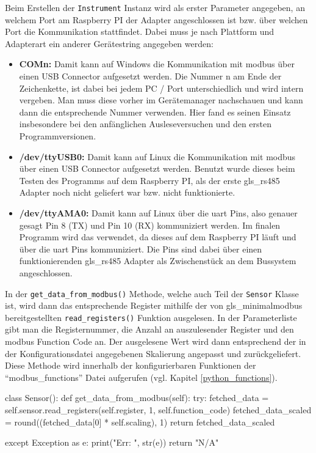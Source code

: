Beim Erstellen der \lstinline{Instrument} Instanz wird als erster Parameter angegeben, an welchem Port am Raspberry PI der Adapter angeschlossen ist bzw. über welchen Port die Kommunikation stattfindet. Dabei muss je nach Plattform und Adapterart ein anderer Gerätestring angegeben werden:
\begin{itemize}
\item \textbf{COMn:} Damit kann auf Windows die Kommunikation mit \gls{modbus} über einen USB Connector aufgesetzt werden. Die Nummer n am Ende der Zeichenkette, ist dabei bei jedem PC / Port unterschiedlich und wird intern vergeben. Man muss diese vorher im Gerätemanager nachschauen und kann dann die entsprechende Nummer verwenden. Hier fand es seinen Einsatz insbesondere bei den anfänglichen Ausleseversuchen und den ersten Programmversionen.
\item \textbf{/dev/ttyUSB0:} Damit kann auf Linux die Kommunikation mit \gls{modbus} über einen USB Connector aufgesetzt werden. Benutzt wurde dieses beim Testen des Programms auf dem Raspberry PI, als der erste \gls{gls_rs485} Adapter noch nicht geliefert war bzw. nicht funktionierte.
\item \textbf{/dev/ttyAMA0:} Damit kann auf Linux über die \ac{uart} Pins, also genauer gesagt Pin 8 (TX) und Pin 10 (RX) kommuniziert werden. Im finalen Programm wird das verwendet, da dieses auf dem Raspberry PI läuft und über die \ac{uart} Pins kommuniziert. Die Pins sind dabei über einen funktionierenden \gls{gls_rs485} Adapter als Zwischenstück an dem Bussystem angeschlossen.
\end{itemize}

\vfill

\label{get_data_from_modbus}
In der \lstinline{get_data_from_modbus()} Methode, welche auch Teil der \lstinline{Sensor} Klasse ist, wird dann das entsprechende Register mithilfe der von \gls{gls_minimalmodbus} bereitgestellten \lstinline{read_registers()} Funktion ausgelesen. In der Parameterliste gibt man die Registernummer, die Anzahl an auszulesender Register und den \gls{modbus} Function Code an. Der ausgelesene Wert wird dann entsprechend der in der Konfigurationsdatei angegebenen Skalierung angepasst und zurückgeliefert. Diese Methode wird innerhalb der konfigurierbaren Funktionen der \enquote{modbus\_functions} Datei aufgerufen (vgl. Kapitel \ref{python_functions}).

\begin{pythoncode}
class Sensor():
	def get_data_from_modbus(self):
		try:
			fetched_data = self.sensor.read_registers(self.register, 1, self.function_code)
			fetched_data_scaled = round((fetched_data[0] * self.scaling), 1)
			return fetched_data_scaled
		
		except Exception as e:
			print("Err: ", str(e))
			return "N/A"
\end{pythoncode}

